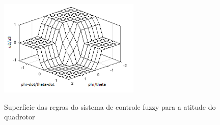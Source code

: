 \begin{figure}[!htb]
    \centering
    \caption{Superfície das regras do sistema de controle fuzzy para a atitude do quadrotor}
    \includegraphics[width=0.6\textwidth]{./04-figuras/resultados/fis_u3/u2_u3_sugeno_surface}
    \label{fig:u2_u3_sugeno_surface}
\end{figure}


